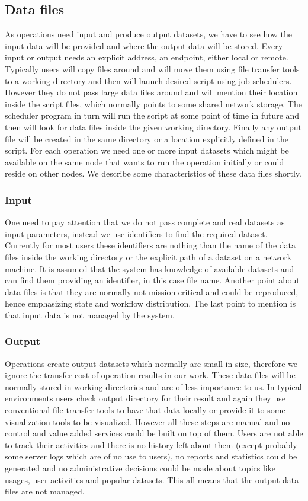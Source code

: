 \subsection{Data files}
As operations need input and produce output datasets, we have to see how the input data will be provided and where the output
data will be stored. Every input or output needs an explicit address, an endpoint, either local or remote.
Typically users will copy files around and will move them using file transfer tools to a working directory and then will
launch desired script using job schedulers. However they do not pass large data files around and will mention their location
inside the script files, which normally points to some shared network storage. 
The scheduler program in turn will run the script at some point of time in future and then
will look for data files inside the given working directory. Finally any output file will be created in the same directory or a location
explicitly defined in the script.
For each operation we need one or more input datasets which might be available on the same node that wants to run the operation
initially or could reside on other nodes. We describe some characteristics of these data files shortly.

\subsubsection{Input}
One need to pay attention that we do not pass complete and real datasets as input parameters,
instead we use identifiers to find the required dataset. Currently for most users these identifiers are nothing
than the name of the data files inside the working directory or the explicit path of a dataset on a network machine.
It is assumed that the system has knowledge of available
datasets and can find them providing an identifier, in this case file name. 
Another point about data files is that they are normally not mission critical and could be reproduced, 
hence emphasizing state and workflow distribution.
 The last point to mention is that input data is not managed by the system.

\subsubsection{Output}
Operations create output datasets which normally are small in size, therefore we ignore the transfer cost of operation
results in our work. These data files will be normally stored in working directories and are of less importance to us.
In typical environments users check output directory for their result and again they use conventional file transfer
tools to have that data locally or provide it to some visualization tools to be visualized. However all these steps
are manual and no control and value added services could be built on top of them. Users are not able to track their
activities and there is no history left about them (except probably some server logs which are of no use to users), 
no reports and statistics could be generated and no
administrative decisions could be made about topics like usages, user activities and popular datasets.
 This all means that the output data files are not managed.

